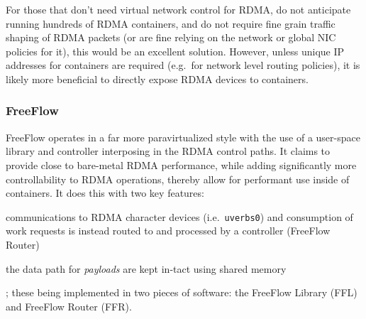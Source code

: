 \documentclass[12pt,titlepage]{article}
\begin{document}
For those that don't need virtual network control for RDMA, do not anticipate running hundreds of RDMA containers, and do not require fine grain traffic shaping of RDMA packets (or are fine relying on the network or global NIC policies for it), this would be an excellent solution.
However, unless unique IP addresses for containers are required (e.g.\ for network level routing policies), it is likely more beneficial to directly expose RDMA devices to containers.

\subsubsection{FreeFlow}
FreeFlow operates in a far more paravirtualized style with the use of a user-space library and controller interposing in the RDMA control paths.
It claims to provide close to bare-metal RDMA performance, while adding significantly more controllability to RDMA operations, thereby allow for performant use inside of containers.
It does this with two key features:
\begin{enumerate*}[label={(\arabic*)},itemjoin*={{, and }},itemjoin={{, }}]
	\item communications to RDMA character devices (i.e.\ \texttt{uverbs0}) and consumption of work requests is instead routed to and processed by a controller (FreeFlow Router)
	\item the data path for \textit{payloads} are kept in-tact using shared memory
\end{enumerate*};
these being implemented in two pieces of software: the FreeFlow Library (FFL) and FreeFlow Router (FFR).
\end{document}
